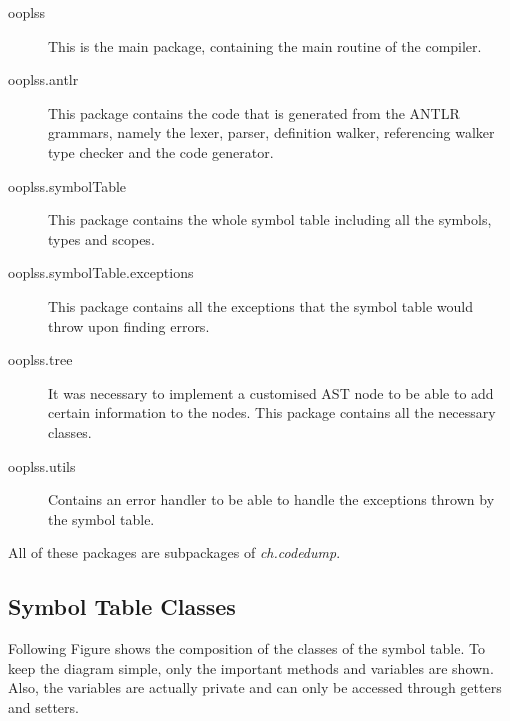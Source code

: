 \begin{description}
\item[ooplss] This is the main package, containing the main routine of the 
compiler.
\item[ooplss.antlr] This package contains the code that is generated from the 
ANTLR grammars, namely the lexer, parser, definition walker, referencing walker
type checker and the code generator.
\item[ooplss.symbolTable] This package contains the whole symbol table including
all the symbols, types and scopes.
\item[ooplss.symbolTable.exceptions] This package contains all the exceptions 
that the symbol table would throw upon finding errors.
\item[ooplss.tree] It was necessary to implement a customised AST node to be 
able to add certain information to the nodes. This package contains all the 
necessary classes.
\item[ooplss.utils] Contains an error handler to be able to handle the
exceptions thrown by the symbol table.
\end{description}

All of these packages are subpackages of \emph{ch.codedump}.

\subsection{Symbol Table Classes}

Following Figure shows the composition of the classes of the symbol table.
To keep the diagram simple, only the important methods and variables are
shown. Also, the variables are actually private and can only be accessed through
getters and setters.

